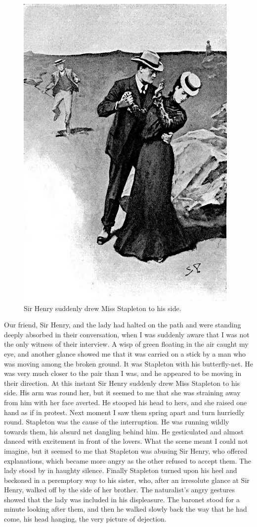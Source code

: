 \documentclass[paper=5.5in:8.5in,BCOR=7mm,twoside,DIV=calc,12pt,usegeometry,openany,chapterprefix,endperiod]{scrbook} %
\begin{document}
\begin{figure}[tbh]
\centering
\includegraphics[width=.7\linewidth]{09_drewmiss}
\caption{Sir Henry suddenly drew Miss Stapleton to his side.}
\end{figure}

Our friend, Sir Henry, and the lady had halted on the path and were standing deeply absorbed in their conversation, when I was suddenly aware that I was not the only witness of their interview. A wisp of green floating in the air caught my eye, and another glance showed me that it was carried on a stick by a man who was moving among the broken ground. It was Stapleton with his butterfly-net. He was very much closer to the pair than I was, and he appeared to be moving in their direction. At this instant Sir Henry suddenly drew Miss Stapleton to his side. His arm was round her, but it seemed to me that she was straining away from him with her face averted. He stooped his head to hers, and she raised one hand as if in protest. Next moment I saw them spring apart and turn hurriedly round. Stapleton was the cause of the interruption. He was running wildly towards them, his absurd net dangling behind him. He gesticulated and almost danced with excitement in front of the lovers. What the scene meant I could not imagine, but it seemed to me that Stapleton was abusing Sir Henry, who offered explanations, which became more angry as the other refused to accept them. The lady stood by in haughty silence. Finally Stapleton turned upon his heel and beckoned in a peremptory way to his sister, who, after an irresolute glance at Sir Henry, walked off by the side of her brother. The naturalist's angry gestures showed that the lady was included in his displeasure. The baronet stood for a minute looking after them, and then he walked slowly back the way that he had come, his head hanging, the very picture of dejection.
\end{document}
